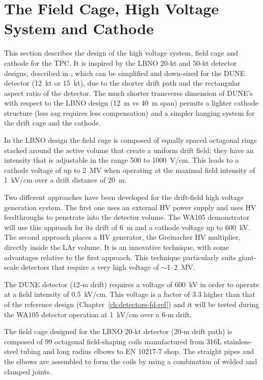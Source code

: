 \section{The Field Cage, High Voltage System and Cathode} 
\label{sec:detectors-fd-alt-hv}

This section describes the design of the high voltage system, field
cage and cathode for the TPC.  It is inspired by the LBNO 20-kt and
50-kt detector designs, described in \anxlbnob, which can
be simplified and down-sized for the DUNE detector (12~kt or 15~kt),
due to the shorter drift path and the rectangular aspect ratio of the
detector. The much shorter transverse dimension of DUNE's with respect
to the LBNO design (12~m vs 40~m span)  permits a lighter cathode structure (less sag
requires less compensation) and a simpler hanging system for the drift
cage and the cathode.

In the LBNO design the field cage is composed of equally spaced
octagonal rings stacked around the active volume 
that create a uniform drift field; they have an intensity 
 that is adjustable in the range 500 to 1000~V/cm. This
leads to a cathode voltage of up to 2~MV when operating at the maximal field 
intensity of 1~kV/cm over a drift distance of 20~m.

Two different approaches have been developed for the drift-field high voltage
generation system. 
The first one uses an external HV power supply and uses
HV feedthroughs to penetrate into the detector volume. The WA105
demonstrator will use this approach for its drift of 6~m and a cathode
voltage up to 600~kV.  The second approach places a HV generator, the Greinacher HV
multiplier, directly inside the LAr volume. It is an innovative technique, with some advantages
relative to the first approach. This technique particularly suits
giant-scale detectors that require a very high voltage of
$\sim$1--2~MV.

The DUNE detector (12-m drift) requires a voltage of 600~kV in order
to operate at a field intensity of 0.5~kV/cm. This voltage is a factor
of 3.3 higher than that of the reference design
(Chapter~\ref{ch:detectors-fd-ref}) and it will be tested during the
WA105 detector operation at 1~kV/cm over a 6-m drift.

The field cage designed for the LBNO 20-kt detector (20-m drift path)
is composed of 99 octagonal field-shaping coils manufactured from 316L
stainless-steel tubing and long radius elbows to EN 10217-7 shop.  The
straight pipes and the elbows are assembled to form the coils
by using a combination of welded and clamped joints.

